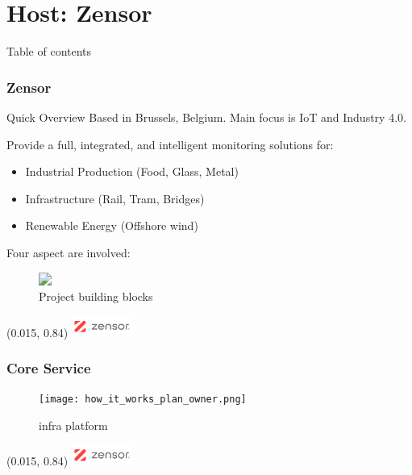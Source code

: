 \section{Host: Zensor}
\SectionPage
\begin{frame}{Table of contents}
    \tableofcontents[currentsection]
\end{frame}

\begin{frame}
    \frametitle{Zensor}

    \begin{alertblock}{Quick Overview}
        Based in Brussels, \alert{Belgium}. Main focus is \acs{IoT} and Industry 4.0.
    \end{alertblock}

    Provide a full, integrated, and intelligent monitoring solutions for:
    \begin{itemize}
        \item
        Industrial Production (Food, Glass, Metal)
        \item
        Infrastructure (Rail, Tram, Bridges)
        \item 
        Renewable Energy (Offshore wind)
    \end{itemize}

    \pause
    \medskip
    Four aspect are involved:
    \begin{figure}[ht]
        \centering
        \includegraphics<2>[width=\textwidth]{4_phases_building_blocks.png}
        \caption{Project building blocks}
    \end{figure}

    \begin{textblock}{1}(0.015, 0.84)
        \includegraphics[width = 2cm]{frames/logos/zensor_logo.png}
    \end{textblock}
\end{frame}

\begin{frame}
    \frametitle{Core Service}
    \begin{figure}[ht]
        \centering
        \texttt{[image: how\_it\_works\_plan\_owner.png]}
        \caption{\acl{infra} platform}
    \end{figure}

    \begin{textblock}{1}(0.015, 0.84)
        \includegraphics[width = 2cm]{frames/logos/zensor_logo.png}
    \end{textblock}
\end{frame}